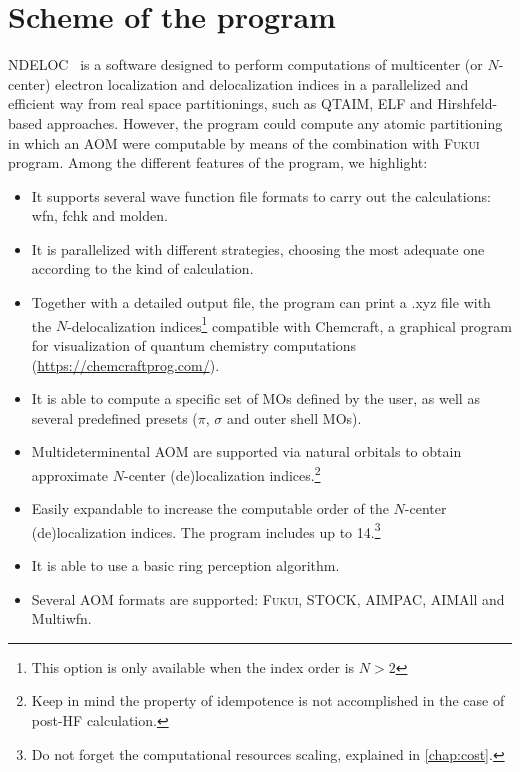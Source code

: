 \documentclass[a4paper,11pt,openany]{memoir}
\newcommand\programa{\textsc{NDELOC}}
\begin{document}
\section{Scheme of the program}
\programa~ is a software designed to perform computations of multicenter (or $N$-center) electron localization and delocalization indices in a parallelized and efficient way from real space partitionings, such as \ac{QTAIM}\autocite{bader1994atoms}, \ac{ELF}\autocite{simplemeasureelectronBE1990,ElectronLocalizationSolidSJF1992} and Hirshfeld-based\autocite{BondedatomfragmentsHirshfeld1977,CriticalanalysisextensionBAA2007,ExtensionHirshfeldMethodGKB2011} approaches. However, the program could compute any atomic partitioning in which an \ac{AOM} were computable by means of the combination with \textsc{Fukui} program. Among the different features of the program, we highlight:
\begin{itemize}
	\item It supports several wave function file formats to carry out the calculations: wfn, fchk and molden.
	\item It is parallelized with different strategies, choosing the most adequate one according to the kind of calculation.
	\item Together with a detailed output file, the program can print a .xyz file with the $N$-delocalization indices\footnote{This option is only available when the index order is $N>2$} compatible with Chemcraft, a graphical program for visualization of quantum chemistry computations (\url{https://chemcraftprog.com/}).
	\item It is able to compute a specific set of \acp{MO} defined by the user, as well as several predefined presets ($\pi$, $\sigma$ and outer shell \acp{MO}).
	\item Multideterminental \ac{AOM} are supported via natural orbitals to obtain approximate $N$-center (de)localization indices.\footnote{Keep in mind the property of idempotence is not accomplished in the case of post-HF calculation.}
	\item Easily expandable to increase the computable order of the $N$-center (de)localization indices. The program includes up to \num{14}.\footnote{Do not forget the computational resources scaling, explained in \autoref{chap:cost}.}
	\item It is able to use a basic ring perception algorithm.
	\item Several \ac{AOM} formats are supported: \textsc{Fukui}, STOCK, AIMPAC, AIMAll and Multiwfn.
\end{itemize}
\end{document}
